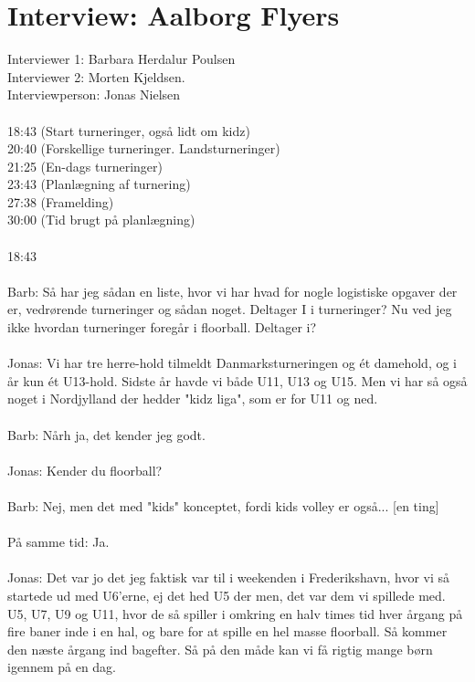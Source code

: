 \chapter{Interview: Aalborg Flyers}\label{ch:appClabel}
Interviewer 1: Barbara Herdalur Poulsen\\
Interviewer 2: Morten Kjeldsen.\\
Interviewperson: Jonas Nielsen
\\
\\
18:43 (Start turneringer, også lidt om kidz)\\
20:40 (Forskellige turneringer. Landsturneringer)\\
21:25 (En-dags turneringer)\\
23:43 (Planlægning af turnering)\\
27:38 (Framelding)\\
30:00 (Tid brugt på planlægning)
\\
\\
18:43
\\\\
Barb: Så har jeg sådan en liste, hvor vi har hvad for nogle logistiske opgaver der er, vedrørende turneringer og sådan noget. Deltager I i turneringer? Nu ved jeg ikke hvordan turneringer foregår i floorball. Deltager i?
\\\\
Jonas: Vi har tre herre-hold tilmeldt Danmarksturneringen og ét damehold, og i år kun ét U13-hold. Sidste år havde vi både U11, U13 og U15. Men vi har så også noget i Nordjylland der hedder "kidz liga", som er for U11 og ned.
\\\\
Barb: Nårh ja, det kender jeg godt.
\\\\
Jonas: Kender du floorball?
\\\\
Barb: Nej, men det med "kids" konceptet, fordi kids volley er også... [en ting]
\\\\
På samme tid: Ja.
\\\\
Jonas: Det var jo det jeg faktisk var til i weekenden i Frederikshavn, hvor vi så startede ud med U6'erne, ej det hed U5 der men, det var dem vi spillede med. U5, U7, U9 og U11, hvor de så spiller i omkring en halv times tid hver årgang på fire baner inde i en hal, og bare for at spille en hel masse floorball. Så kommer den næste årgang ind bagefter. Så på den måde kan vi få rigtig mange børn igennem på en dag. 
